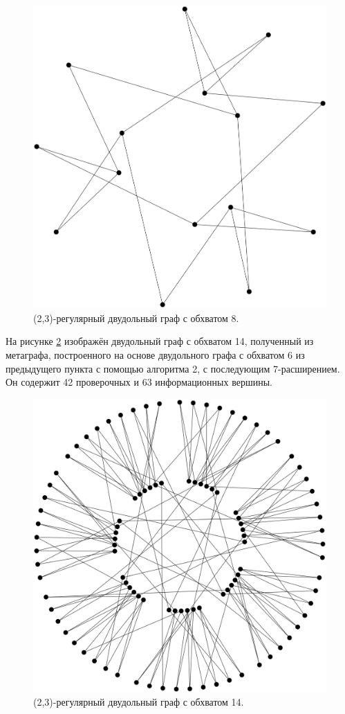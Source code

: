 \documentclass[14pt]{mmcs-article}
\begin{document}
\begin{figure}[H]
    \centering
    \includegraphics[scale=0.2]{graph_2.png}
    \caption{ (2,3)-регулярный двудольный граф с обхватом 8. }
    \label{be_not_afraid}
\end{figure}

На рисунке \ref{be_not_afraid_2} изображён двудольный граф с обхватом 14, полученный из метаграфа, построенного на основе двудольного графа с обхватом 6 из предыдущего пункта с помощью алгоритма 2, с последующим 7-расширением. Он содержит 42 проверочных и 63 информационных вершины.

\begin{figure}[H]
    \centering
    \includegraphics[scale=0.2]{graph_3.png}
    \caption{ (2,3)-регулярный двудольный граф с обхватом 14. }
    \label{be_not_afraid_2}
\end{figure}
\end{document}
